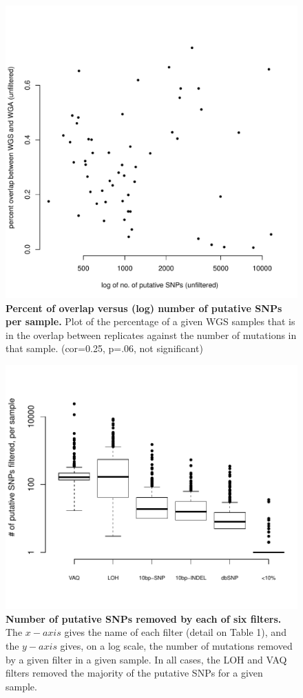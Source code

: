 \documentclass[11pt]{article} %
\begin{document}
\begin{figure}
\centerline{
\includegraphics[width=5in]{unfiltered_total_muts_v_percent_overlap.pdf} }
\caption{\textbf{Percent of overlap versus (log) number of putative SNPs per sample.} Plot of the percentage of a given WGS samples that is in the overlap between replicates against the number of mutations in that sample. (cor=0.25, p=.06, not significant)}
\end{figure}

\begin{figure}
\centerline{
\includegraphics[width=6in]{boxplot_number_filtered.pdf} }
\caption{\textbf{Number of putative SNPs removed by each of six filters.} The $x-axis$ gives the name of each filter (detail on Table 1), and the $y-axis$ gives, on a log scale, the number of mutations removed by a given filter in a given sample. In all cases, the LOH and VAQ filters removed the majority of the putative SNPs for a given sample.}
\end{figure}
\end{document}
